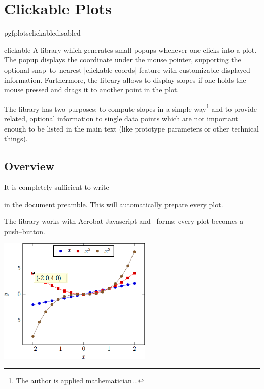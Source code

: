
\section{Clickable Plots}
\begingroup
\def\pgfplotsmanualcurlibrary{clickable}
	\expandafter\ifx\csname pgfplotsclickabledisabled\endcsname\relax
	\else
	\fi
\begin{pgfplotslibrary}{clickable}
	A library which generates small popups whenever one clicks into a plot. The popup displays the coordinate under the mouse pointer, supporting the optional snap--to--nearest |clickable coords| feature with customizable displayed information. Furthermore, the library allows to display slopes if one holds the mouse pressed and drags it to another point in the plot.

	The library has two purposes: to compute slopes in a simple way\footnote{The author is applied mathematician...} and to provide related, optional information to single data points which are not important enough to be listed in the main text (like prototype parameters or other technical things).
\end{pgfplotslibrary}


\subsection{Overview}
	It is completely sufficient to write
\begin{codeexample}
\end{codeexample}
	\noindent in the document preamble. This will automatically prepare every plot.

	The library works with Acrobat Javascript and \pdf\ forms: every plot becomes a push--button.

	\includegraphics[height=6cm]{figures/pgfplotsclickable-fig1.png}
	\hfill

